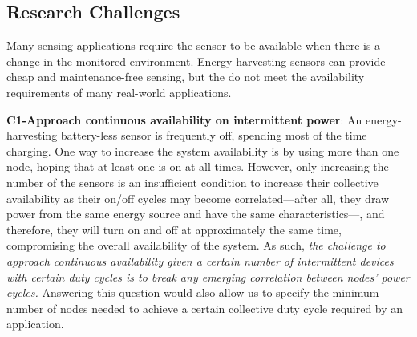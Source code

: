


\subsection{Research Challenges}

Many sensing applications require the sensor to be available when there is a change in the monitored environment.
Energy-harvesting sensors can provide cheap and maintenance-free sensing, but the do not meet the availability requirements of many real-world applications. 

\noindent\textbf{C1-Approach continuous availability on intermittent power}: 
An energy-harvesting battery-less sensor is frequently off, spending most of the time charging. 
One way to increase the system availability is by using more than one node, hoping that at least one is on at all times. However, only increasing the number of the sensors is an insufficient condition to increase their collective availability as their on/off cycles may become correlated---after all, they draw power from the same energy source and have the same characteristics---, and therefore, they will turn on and off at approximately the same time, compromising the overall availability of the system. 
As such, \textit{the challenge to approach continuous availability given a certain number of intermittent devices with certain duty cycles is to break any emerging correlation between nodes' power cycles.}
Answering this question would also allow us to specify the minimum number of nodes needed to achieve a certain collective duty cycle required by an application. 

